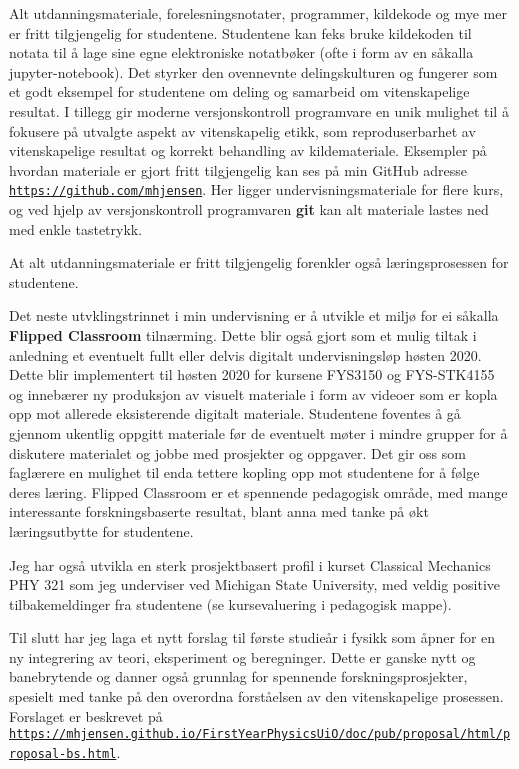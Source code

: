 \documentclass[aps,floatfix,preprint]{revtex4-1}
\begin{document}
Alt utdanningsmateriale, forelesningsnotater, programmer, kildekode og
mye mer er fritt tilgjengelig for studentene. Studentene kan feks bruke
kildekoden til notata til å lage sine egne elektroniske notatbøker
(ofte i form av en såkalla jupyter-notebook). Det styrker den
ovennevnte delingskulturen og fungerer som et godt eksempel for
studentene om deling og samarbeid om vitenskapelige resultat. I
tillegg gir moderne versjonskontroll programvare en unik mulighet til
å fokusere på utvalgte aspekt av vitenskapelig etikk, som
reproduserbarhet av vitenskapelige resultat og korrekt behandling av
kildemateriale.  Eksempler på hvordan materiale er gjort fritt
tilgjengelig kan ses på min GitHub adresse
\href{{https://github.com/mhjensen}}{\nolinkurl{https://github.com/mhjensen}}. Her ligger undervisningsmateriale
for flere kurs, og ved hjelp av versjonskontroll programvaren \textbf{git}
kan alt materiale lastes ned med enkle tastetrykk.

At alt utdanningsmateriale er fritt tilgjengelig forenkler også
læringsprosessen for studentene.

Det neste utvklingstrinnet i min undervisning er å utvikle et miljø
for ei såkalla \textbf{Flipped Classroom} tilnærming. Dette blir også gjort
som et mulig tiltak i anledning et eventuelt fullt eller delvis digitalt  undervisningsløp høsten 2020.  Dette
blir implementert til høsten 2020 for kursene FYS3150 og FYS-STK4155
og innebærer ny produksjon av visuelt materiale i form av videoer som
er kopla opp mot allerede eksisterende digitalt materiale. Studentene
foventes å gå gjennom ukentlig oppgitt materiale før de eventuelt møter i
mindre grupper for å diskutere materialet og jobbe med prosjekter og
oppgaver. Det gir oss som faglærere en mulighet til enda tettere
kopling opp mot studentene for å følge deres læring. Flipped Classroom er et spennende pedagogisk område, med mange interessante forskningsbaserte resultat, blant anna med tanke på økt læringsutbytte for studentene.  


Jeg har også utvikla en sterk prosjektbasert profil i kurset Classical
Mechanics PHY 321 som jeg underviser ved Michigan State University,
med veldig positive tilbakemeldinger fra studentene (se kursevaluering
i pedagogisk mappe).


Til slutt har jeg laga et nytt forslag til første studieår i fysikk
som åpner for en ny integrering av teori, eksperiment og
beregninger. Dette er ganske nytt og banebrytende og danner også
grunnlag for spennende forskningsprosjekter, spesielt med tanke på den overordna forståelsen av den vitenskapelige prosessen. Forslaget er beskrevet på
\href{{https://mhjensen.github.io/FirstYearPhysicsUiO/doc/pub/proposal/html/proposal-bs.html}}{\nolinkurl{https://mhjensen.github.io/FirstYearPhysicsUiO/doc/pub/proposal/html/proposal-bs.html}}.
\end{document}
